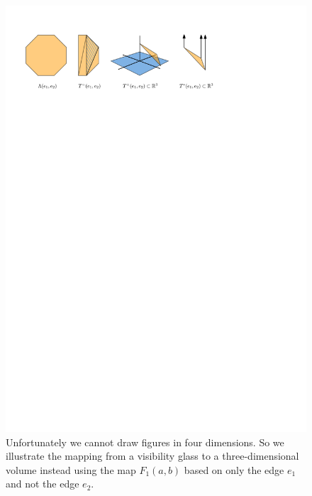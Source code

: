 \documentclass[UKenglish]{lipics-v2019}
\begin{document}
\begin{figure} [tb]
	\centering \includegraphics {threedimensional} 
	\caption
	{
	  Unfortunately we cannot draw figures in four dimensions. So we illustrate the mapping from a visibility glass to a three-dimensional volume instead using the map $F_1(a,b)$ based on only the edge $e_1$ and not the edge $e_2$.  
	}  
	\label{fig:threedimensional}
\end{figure}
\end{document}
